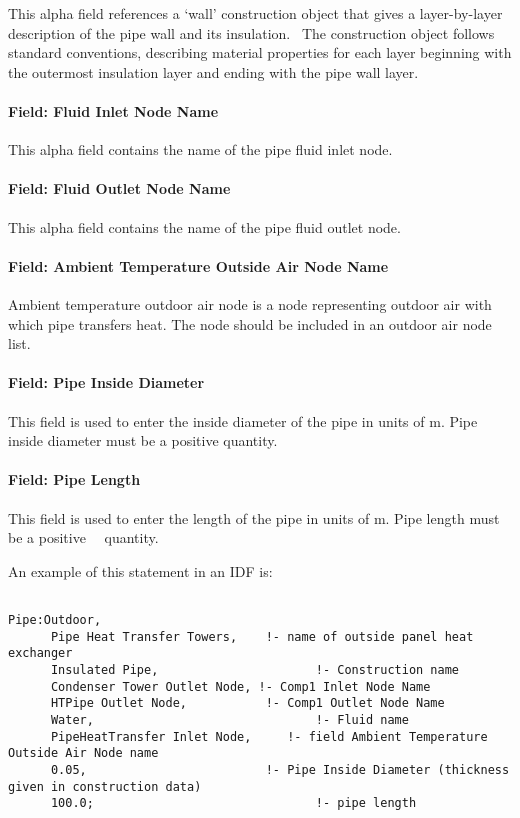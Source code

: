 This alpha field references a `wall' construction object that gives a layer-by-layer description of the pipe wall and its insulation.~ The construction object follows standard conventions, describing material properties for each layer beginning with the outermost insulation layer and ending with the pipe wall layer.

\paragraph{Field: Fluid Inlet Node Name}\label{field-fluid-inlet-node-name-1-000}

This alpha field contains the name of the pipe fluid inlet node.

\paragraph{Field: Fluid Outlet Node Name}\label{field-fluid-outlet-node-name-1-000}

This alpha field contains the name of the pipe fluid outlet node.

\paragraph{Field: Ambient Temperature Outside Air Node Name}\label{field-ambient-temperature-outside-air-node-name}

Ambient temperature outdoor air node is a node representing outdoor air with which pipe transfers heat. The node should be included in an outdoor air node list.

\paragraph{Field: Pipe Inside Diameter}\label{field-pipe-inside-diameter-1}

This field is used to enter the inside diameter of the pipe in units of m. Pipe inside diameter must be a positive quantity.

\paragraph{Field: Pipe Length}\label{field-pipe-length-1}

This field is used to enter the length of the pipe in units of m. Pipe length must be a positive~~ quantity.

An example of this statement in an IDF is:

\begin{lstlisting}

Pipe:Outdoor,
      Pipe Heat Transfer Towers,    !- name of outside panel heat exchanger
      Insulated Pipe,                      !- Construction name
      Condenser Tower Outlet Node, !- Comp1 Inlet Node Name
      HTPipe Outlet Node,           !- Comp1 Outlet Node Name
      Water,                               !- Fluid name
      PipeHeatTransfer Inlet Node,     !- field Ambient Temperature Outside Air Node name
      0.05,                         !- Pipe Inside Diameter (thickness given in construction data)
      100.0;                               !- pipe length
\end{lstlisting}

